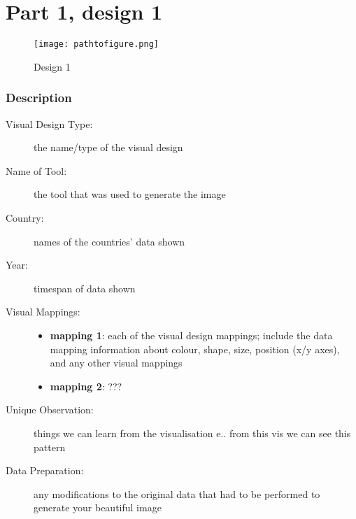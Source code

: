 \hypertarget{part-1-design-1}{%
\section{Part 1, design 1}\label{part-1-design-1}}

\begin{figure}
\centering
\texttt{[image: pathtofigure.png]}
\caption{Design 1}
\end{figure}

\hypertarget{description}{%
\subsubsection{Description}\label{description}}

\begin{description}
\item[Visual Design Type:]
the name/type of the visual design
\item[Name of Tool:]
the tool that was used to generate the image
\item[Country:]
names of the countries' data shown
\item[Year:]
timespan of data shown

\item[Visual Mappings:]
\begin{itemize}
\tightlist
\item
  \textbf{mapping 1}: each of the visual design mappings; include the data mapping information about colour, shape, size, position (x/y axes), and any other visual mappings
\end{itemize}

\begin{itemize}
\tightlist
\item
  \textbf{mapping 2}: ???
\end{itemize}

\item[Unique Observation:]
things we can learn from the visualisation e.. from this vis we can see this pattern

\item[Data Preparation:]
any modifications to the original data that had to be performed to generate your beautiful image
\end{description}
